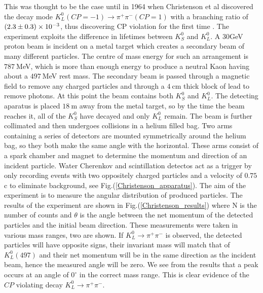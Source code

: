 This was thought to be the case until in 1964 when Christenson et al discovered the decay mode $K^{0}_{L}(CP = -1) \rightarrow \pi^+ \pi^- (CP = 1)$ with a branching ratio of $(2.3 \pm 0.3) \times 10^{-3}$, thus discovering CP violation for the first time \cite{FirstCPV}. The experiment exploits the difference in lifetimes between $K^{0}_{S}$ and $K^{0}_{L}$. A 30GeV proton beam is incident on a metal target which creates a secondary beam of many different particles. The centre of mass energy for such an arrangement is $787~$MeV, which is more than enough energy to produce a neutral Kaon having about a $497~$MeV rest mass. The secondary beam is passed through a magnetic field to remove any charged particles and through a $4~$cm thick block of lead to remove photons. At this point the beam contains both $K^{0}_{S}$ and $K^{0}_{L}$. The detecting aparatus is placed $18~$m away from the metal target, so by the time the beam reaches it, all of the $K^{0}_{S}$ have decayed and only $K^{0}_{L}$ remain. The beam is further collimated and then undergoes collisions in a helium filled bag. Two arms containing a series of detectors are mounted symmetrically around the helium bag, so they both make the same angle with the horizontal. These arms consist of a spark chamber and magnet to determine the momentum and direction of an incident particle. Water Cherenkov and scintillation detectos act as a trigger by only recording events with two oppositely charged particles and a velocity of $0.75~$c to eliminate background, see Fig.(\ref{Christenson_apparatus}). The aim of the experiment is to measure the angular distribution of produced particles. The results of the experiment are shown in Fig.(\ref{Christenson_results}) where N is the number of counts and $\theta$ is the angle between the net momentum of the detected particles and the initial beam direction. These measurements were taken in various mass ranges, two are shown. If $K^{0}_{L} \rightarrow \pi^+ \pi^-$ is observed, the detected particles will have opposite signs, their invariant mass will match that of $K^{0}_{L}(497)$ and their net momentum will be in the same direction as the incident beam, hence the measured angle will be zero. We see from the results that a peak occurs at an angle of $0^{\circ}$ in the correct mass range. This is clear evidence of the $CP$ violating decay $K^{0}_{L} \rightarrow \pi^+ \pi^-$.   

